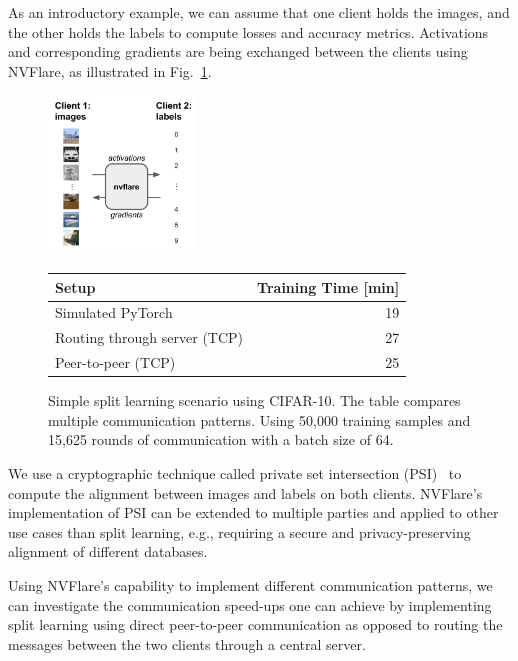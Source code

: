 \documentclass[11pt]{article}
\begin{document}
As an introductory example, we can assume that one client holds the images, and the other holds the labels to compute losses and accuracy metrics. Activations and corresponding gradients are being exchanged between the clients using NVFlare, as illustrated in Fig.~\ref{fig:split_learning}.
%
\begin{figure}[htbp]
\centering
\includegraphics[width=0.35\textwidth]{submissions/HolgerRoth/fig/split_learning.pdf}
\hspace{2em}
\footnotesize
\begin{tabular}[b]{||l r||}
\hline
\textbf{Setup} & \textbf{Training Time [min]} \\ [0.5ex]
\hline\hline
Simulated PyTorch & 19 \\
Routing through server (TCP) & 27  \\
Peer-to-peer (TCP) & 25  \\ [1ex]
\hline
\end{tabular}
\caption{Simple split learning scenario using CIFAR-10. The table compares multiple communication patterns. Using 50,000 training samples and 15,625 rounds of communication with a batch size of 64. \label{fig:split_learning}}
\end{figure}
%
We use a cryptographic technique called private set intersection (PSI)~\cite{enwiki:1131516757} to compute the alignment between images and labels on both clients. NVFlare's implementation of PSI can be extended to multiple parties and applied to other use cases than split learning, e.g., requiring a secure and privacy-preserving alignment of different databases.

Using NVFlare's capability to implement different communication patterns, we can investigate the communication speed-ups one can achieve by implementing split learning using direct peer-to-peer communication as opposed to routing the messages between the two clients through a central server.
\end{document}
